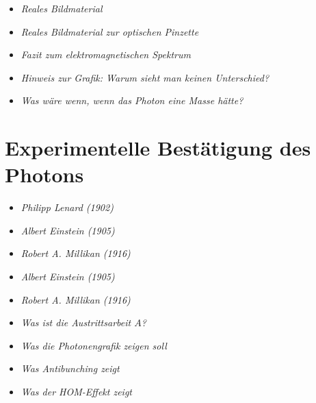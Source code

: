 \medskip
\begin{tcolorbox}[title=Hinweisboxen,hinweisbox]
\begin{itemize}
	\item \emph{Reales Bildmaterial} \dotfill\pageref{keybox:RealesBildmaterial}
	\item \emph{Reales Bildmaterial zur optischen Pinzette} \dotfill\pageref{box:Manipulation kleiner Partikel}
	\item \emph{Fazit zum elektromagnetischen Spektrum} \dotfill\pageref{box:Fazit zum elektro}
	\item \emph{Hinweis zur Grafik: Warum sieht man  keinen Unterschied?} \dotfill\pageref{box:Warum sieht man}
\end{itemize}
\end{tcolorbox}



\medskip
\begin{tcolorbox}[title=hypothetische Boxen,hypobox]
\begin{itemize}
	\item \emph{Was wäre wenn, wenn das Photon eine Masse hätte?} \dotfill\pageref{box:was wäre wenn}
\end{itemize}
\end{tcolorbox}


\section{Experimentelle Bestätigung des Photons}


\medskip
\begin{tcolorbox}[title=physikalische Boxen,physikbox]
\begin{itemize}
	\item \emph{Philipp Lenard (1902)}\dotfill\pageref{box:Philipp Lenhard}
	\item \emph{Albert Einstein (1905)} \dotfill\pageref{die Erzeuguung von Licht}
	\item \emph{Robert A. Millikan (1916)} \dotfill\pageref{box:Robert A, Millikan}
	\item \emph{Albert Einstein (1905)}\dotfill\pageref{die Erscheinung der Wärm}
	\item \emph{Robert A. Millikan (1916)} \dotfill\pageref{box:einsteins gleichung passt}
	\item \emph{Was ist die Austrittsarbeit \( A \)?} \dotfill\pageref{bos:was ist Austrittsarbeit}
	\item \emph{Was die Photonengrafik zeigen soll} \dotfill\pageref{box:was die photonengrafik}
	\item \emph{Was Antibunching zeigt} \dotfill\pageref{box:wasAntibunching}
	\item \emph{Was der HOM-Effekt zeigt} \dotfill\pageref{box:HOM-Effekt}
\end{itemize}
\end{tcolorbox}

